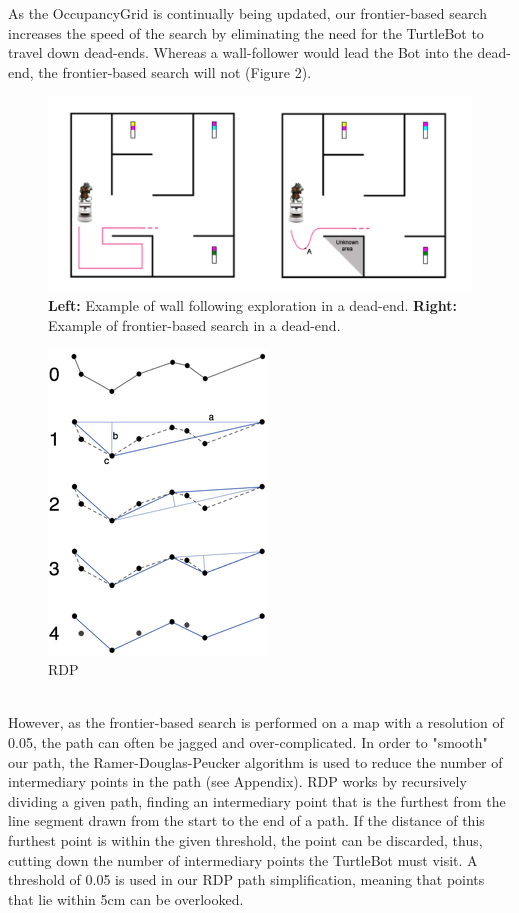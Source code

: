 \documentclass[titlepage,12pt,a4paper]{article}
\begin{document}
\pagebreak


\noindent
As the OccupancyGrid is continually being updated, our frontier-based search increases the speed of the search by eliminating the need for the TurtleBot to travel down dead-ends. Whereas a wall-follower would lead the Bot into the dead-end, the frontier-based search will not (Figure 2).\\

\begin{figure}[h]
	\centering
	\includegraphics[scale=0.2]{paths.jpg}
	\caption{\textbf{Left:} Example of wall following exploration in a dead-end. \textbf{Right:} Example of frontier-based search in a dead-end.}
\end{figure}

\begin{figure}
	\includegraphics[scale=0.5]{rdp.png}
	\caption{RDP}
\end{figure}

\noindent
\\However, as the frontier-based search is performed on a map with a resolution of 0.05, the path can often be jagged and over-complicated. In order to "smooth" our path, the Ramer-Douglas-Peucker algorithm is used to reduce the number of intermediary points in the path (see Appendix). RDP works by recursively dividing a given path, finding an intermediary point that is the furthest from the line segment drawn from the start to the end of a path. If the distance of this furthest point is within the given threshold, the point can be discarded, thus, cutting down the number of intermediary points the TurtleBot must visit. A threshold of 0.05 is used in our RDP path simplification, meaning that points that lie within 5cm can be overlooked.\\
\end{document}
